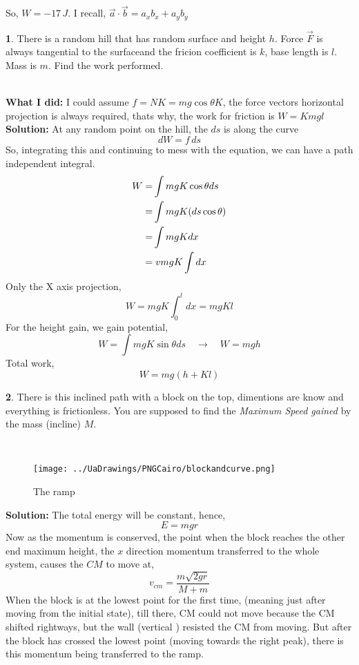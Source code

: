 \documentclass[a4paper]{article}
\theoremstyle{definition}
\newtheorem{prob}{ \framebox[0.09\textwidth]{{\sffamily Pr}} }
\newcommand{\pr}[1]{ \begin{tcolorbox} \begin{prob} 
    #1 
\end{prob} 
   \end{tcolorbox}\ 
   \\
 }
\begin{document}
So, $W = -17\,J$. I recall, $ \vec{a} \cdot \vec{b} = a_xb_x + a_yb_y $\\
\pr{There is a random hill that has random surface and height $h$. Force $\vec{F}$ is always tangential
to the surfaceand the fricion coefficient is $k$, base length is $l$. Mass is $m$. Find the work performed.}
\textbf{What I did:} I could assume $f = NK = mg \cos \theta K$, the force vectors horizontal projection is always required, thats why, the work for friction is $W = Kmgl$ \\
\textbf{Solution:} At any random point on the hill, the $ds$ is along the curve
\begin{equation}
dW = f \,ds
\end{equation}
So, integrating this and continuing to 
mess with the equation, we can have a path independent integral.
\begin{align}
W =& \int mgK \cos \theta ds\\ \notag
=& \int mgK ( ds  \cos \theta)\\\notag
=& \int mgK dx \\\notag
=& \;v mgK \int dx
\end{align}
Only the X axis projection, 
\begin{equation}
W = mgK \int_{0}^{l} dx = mgKl
\end{equation}
For the height gain, we gain potential,
\begin{equation}
W = \int mgK \sin \theta ds \quad \rightarrow \quad W = mgh
\end{equation}
Total work,
\begin{equation}
W = mg (h + Kl)
\end{equation}



\pr{There is this inclined path with a block on the top, dimentions are know and everything is frictionless.
You are supposed to find the \emph{Maximum Speed gained} by the mass (incline) $M$.}
\begin{figure} [hbtp]
    \centering
    \texttt{[image: ../UaDrawings/PNGCairo/blockandcurve.png]}
    \caption{The ramp}
    \label{ }
\end{figure} 
\textbf{Solution:}
The total energy will be constant, hence, 
\[ E = mgr \]
Now as the momentum is conserved, the point when the block reaches the other end maximum height, the $x$ direction momentum transferred to
the whole system, causes the $CM$ to move at, 
\[v_{cm } =\frac{m \sqrt{2 g r} }{M + m} \] 
When the block is at the lowest point for the first time, (meaning just after moving from the initial state), till there,
CM could not move because the CM shifted rightways, but the wall (vertical ) resisted the CM from moving. But after the block has crossed
the lowest point (moving towards the right peak), there is this momentum being transferred to the ramp. 
\end{document}
